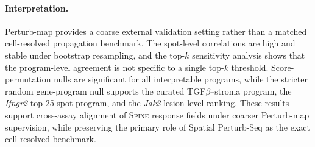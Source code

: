 \documentclass[sigconf,review,balance=false]{acmart}
\newcommand{\methodname}{\textsc{Spine}\xspace}
\begin{document}
\paragraph{Interpretation.}
Perturb-map provides a coarse external validation setting rather than a matched
cell-resolved propagation benchmark. The spot-level correlations are high and stable
under bootstrap resampling, and the top-$k$ sensitivity analysis shows that the
program-level agreement is not specific to a single top-$k$ threshold. Score-permutation
nulls are significant for all interpretable programs, while the stricter random
gene-program null supports the curated TGF$\beta$--stroma program, the \textit{Ifngr2}
top-25 spot program, and the \textit{Jak2} lesion-level ranking. These results support
cross-assay alignment of \methodname{} response fields under coarser Perturb-map
supervision, while preserving the primary role of Spatial Perturb-Seq as the exact
cell-resolved benchmark.
\end{document}
